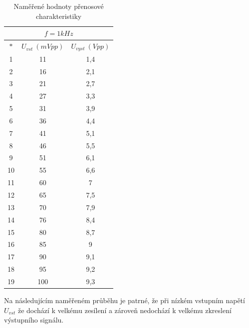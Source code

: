 \documentclass[a4paper, czech]{article}
\begin{document}
\begin{table}[H]
    \centering
    \begin{tabular}{ccc}
        \multicolumn{3}{c}{$f = 1kHz$} \\
        \toprule
        $*$  & $U_{vst}\ (mVpp)$ & $U_{vyst}\ (Vpp)$ \\
        \midrule
        1  & 11        & 1,4       \\
        2  & 16        & 2,1       \\
        3  & 21        & 2,7       \\
        4  & 27        & 3,3       \\
        5  & 31        & 3,9       \\
        6  & 36        & 4,4       \\
        7  & 41        & 5,1       \\
        8  & 46        & 5,5       \\
        9  & 51        & 6,1       \\
        10 & 55        & 6,6       \\
        11 & 60        & 7         \\
        12 & 65        & 7,5       \\
        13 & 70        & 7,9       \\
        14 & 76        & 8,4       \\
        15 & 80        & 8,7       \\
        16 & 85        & 9         \\
        17 & 90        & 9,1       \\
        18 & 95        & 9,2       \\
        19 & 100       & 9,3       \\
        \bottomrule
    \end{tabular}
    \caption{Naměřené hodnoty přenosové charakteristiky}
\end{table}

Na následujícím naměřeném průběhu je patrné, že při nízkém vstupním napětí $U_{vst}$ že dochází k velkému zesílení a zároveň nedochází k velkému zkreslení výstupního signálu.
\end{document}
